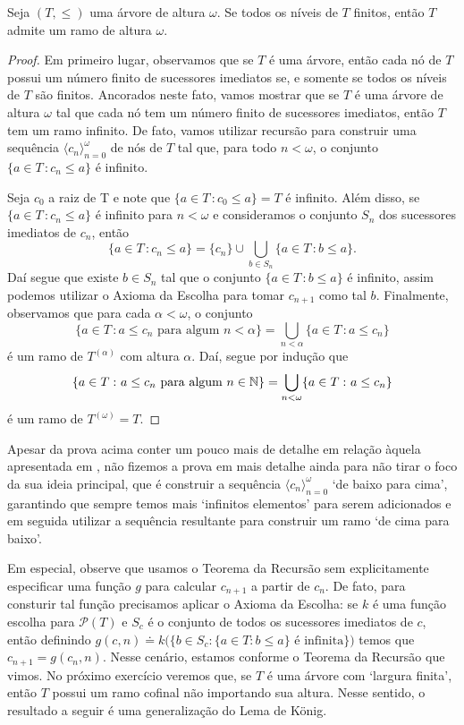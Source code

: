 \documentclass[a4paper]{article}
\begin{document}
  \begin{teo}
  Seja \((T,\leq)\) uma árvore de altura \(\omega\). Se todos os níveis de \(T\) finitos, então
  \(T\) admite um ramo de altura \(\omega\).
  \end{teo}
\begin{proof}
  Em primeiro lugar, observamos que se  \(T\) é uma árvore, então cada nó de \(T\) possui
  um número finito de sucessores imediatos se, e somente se todos os níveis de
  \(T\) são finitos. Ancorados neste fato, vamos mostrar que se \(T\) é uma
  árvore de altura \(\omega\) tal que cada nó tem um número finito de sucessores
  imediatos,  então \(T\) tem um ramo infinito. De fato, vamos utilizar recursão
  para  construir uma sequência \(\langle c_n\rangle_{n=0}^{\omega}\)  de nós de \(T\) tal que,
  para todo \(n<\omega\), o conjunto \(\{a\in T\,\colon c_n\leq a\}\) é
  infinito.

  Seja \(c_0\) a raiz de T e  note que \(\{a \in T\,\colon c_{0} \leq a \}= T\)
  é infinito. Além disso, se \(\{a\in T\,\colon c_n\leq a\}\) é infinito para
  \(n<\omega\) e consideramos  o
  conjunto \(S_n\) dos sucessores imediatos de \(c_n\), então
  \[
  \{a\in T\,\colon c_n\leq a\} = \{c_n\} \cup\bigcup_{b\in S_n} \{a\in T\,\colon b\leq a\}.
  \]
 Daí segue que existe \(b\in S_n\) tal que o conjunto \(\{a\in T\,\colon
 b\leq a\}\) é infinito, assim podemos utilizar o Axioma da Escolha para
 tomar \(c_{n+1}\) como tal \(b\). 
 Finalmente, observamos que para cada \(\alpha<\omega\), o conjunto
 \[\{a\in T\,\colon  a\leq c_n \text{ para algum }
   n<\alpha\}=\bigcup_{n<\alpha}\{a\in T\,\colon a\leq c_n\}\] é
  um ramo de \(T^{(\alpha)}\) com altura \(\alpha\). Daí,
  segue por indução que \[\{a\in T\,\colon a\leq c_n \text{ para algum }
    n\in\mathbb{N}\}=\bigcup_{n <\omega}\{a\in T\,\colon a\leq c_n\}\]
  é um ramo de \(T^{(\omega)}=T\).
  \end{proof}

    Apesar da prova acima conter um pouco mais de detalhe em relação àquela
    apresentada em \cite{jech}, não fizemos a prova em mais detalhe ainda para
    não tirar o foco da sua ideia principal, que é construir a sequência
    \(\langle c_n\rangle_{n=0}^\omega\)  `de baixo para cima', garantindo que
    sempre temos mais `infinitos elementos' para serem adicionados e em seguida
    utilizar a sequência resultante para construir um ramo `de cima para baixo'.

    Em especial, observe que usamos o Teorema da Recursão sem
    explicitamente especificar uma função \(g\) para
    calcular \(c_{n+1}\) a partir de \(c_n\). De fato, para consturir tal função precisamos
    aplicar o Axioma da Escolha: se \(k\) é uma função escolha para
    \(\mathcal{P}(T)\) e \(S_c\) é o conjunto de todos os sucessores imediatos
    de \(c\), então definindo \(g(c,n) \doteq k\big ( \{b\in S_c: \{a\in T: b\leq a\} \text{ é
      infinita}\}\big )\) temos que \(c_{n+1} = g(c_n, n)\). Nesse cenário, estamos
    conforme o Teorema da Recursão que vimos. No próximo exercício veremos que,
    se \(T\) é uma árvore com `largura finita', então \(T\) possui um ramo
    cofinal não importando sua altura. Nesse sentido, o resultado a seguir é uma
    generalização do Lema de König.
  
\end{document}
